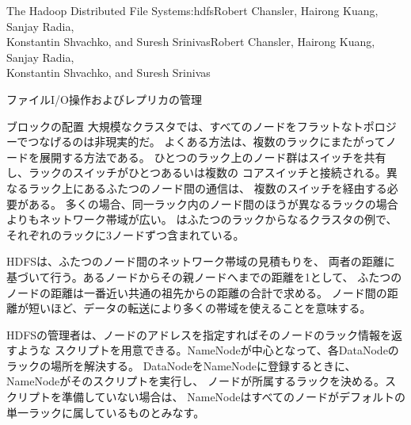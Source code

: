 \begin{aosachaptertoc}{The Hadoop Distributed File System}{s:hdfs}{Robert Chansler, Hairong Kuang, Sanjay Radia, \\ Konstantin Shvachko, and Suresh Srinivas}{Robert Chansler, Hairong Kuang, Sanjay Radia, \\ \hspace*{0.9cm} Konstantin Shvachko, and Suresh Srinivas}
\begin{aosasect1}{ファイルI/O操作およびレプリカの管理}
\begin{aosasect2}{ブロックの配置}
大規模なクラスタでは、すべてのノードをフラットなトポロジーでつなげるのは非現実的だ。
よくある方法は、複数のラックにまたがってノードを展開する方法である。
ひとつのラック上のノード群はスイッチを共有し、ラックのスイッチがひとつあるいは複数の
コアスイッチと接続される。異なるラック上にあるふたつのノード間の通信は、
複数のスイッチを経由する必要がある。
多くの場合、同一ラック内のノード間のほうが異なるラックの場合よりもネットワーク帯域が広い。
はふたつのラックからなるクラスタの例で、
それぞれのラックに3ノードずつ含まれている。


HDFSは、ふたつのノード間のネットワーク帯域の見積もりを、
両者の距離に基づいて行う。あるノードからその親ノードへまでの距離を1として、
ふたつのノードの距離は一番近い共通の祖先からの距離の合計で求める。
ノード間の距離が短いほど、データの転送により多くの帯域を使えることを意味する。

HDFSの管理者は、ノードのアドレスを指定すればそのノードのラック情報を返すような
スクリプトを用意できる。NameNodeが中心となって、各DataNodeのラックの場所を解決する。
DataNodeをNameNodeに登録するときに、NameNodeがそのスクリプトを実行し、
ノードが所属するラックを決める。スクリプトを準備していない場合は、
NameNodeはすべてのノードがデフォルトの単一ラックに属しているものとみなす。


\end{aosasect2}
\end{aosasect1}
\end{aosachaptertoc}
